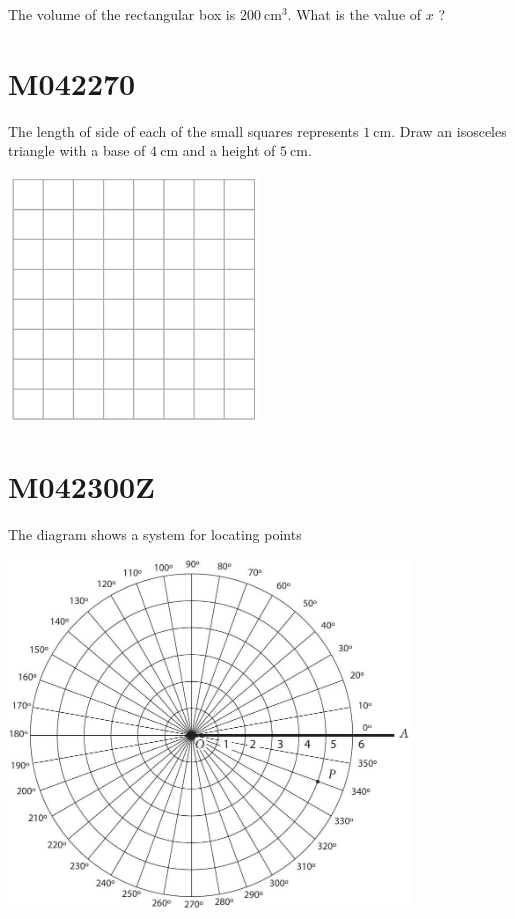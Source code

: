 \documentclass[12pt]{article}
\begin{document}
The volume of the rectangular box is $200 \mathrm{~cm}^{3}$. What is the value of $x$ ?

\newpage
\section*{M042270}

The length of side of each of the small squares represents $1 \mathrm{~cm}$. Draw an isosceles triangle with a base of $4 \mathrm{~cm}$ and a height of $5 \mathrm{~cm}$.

\includegraphics[max width=0.5\textwidth]{2024_02_20_828ebc9d68bcc1fbb223g-65}

\newpage
\section*{M042300Z}

The diagram shows a system for locating points


\includegraphics[max width=0.8\textwidth]{2024_02_20_828ebc9d68bcc1fbb223g-66}
\end{document}

